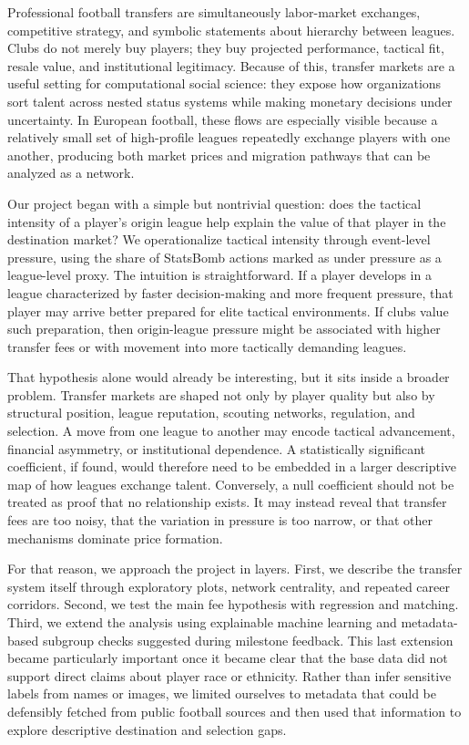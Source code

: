 \documentclass[12pt]{article}
\begin{document}
Professional football transfers are simultaneously labor-market exchanges, competitive strategy, and symbolic statements about hierarchy between leagues. Clubs do not merely buy players; they buy projected performance, tactical fit, resale value, and institutional legitimacy. Because of this, transfer markets are a useful setting for computational social science: they expose how organizations sort talent across nested status systems while making monetary decisions under uncertainty. In European football, these flows are especially visible because a relatively small set of high-profile leagues repeatedly exchange players with one another, producing both market prices and migration pathways that can be analyzed as a network.

Our project began with a simple but nontrivial question: does the tactical intensity of a player's origin league help explain the value of that player in the destination market? We operationalize tactical intensity through event-level pressure, using the share of StatsBomb actions marked as under pressure as a league-level proxy. The intuition is straightforward. If a player develops in a league characterized by faster decision-making and more frequent pressure, that player may arrive better prepared for elite tactical environments. If clubs value such preparation, then origin-league pressure might be associated with higher transfer fees or with movement into more tactically demanding leagues.

That hypothesis alone would already be interesting, but it sits inside a broader problem. Transfer markets are shaped not only by player quality but also by structural position, league reputation, scouting networks, regulation, and selection. A move from one league to another may encode tactical advancement, financial asymmetry, or institutional dependence. A statistically significant coefficient, if found, would therefore need to be embedded in a larger descriptive map of how leagues exchange talent. Conversely, a null coefficient should not be treated as proof that no relationship exists. It may instead reveal that transfer fees are too noisy, that the variation in pressure is too narrow, or that other mechanisms dominate price formation.

For that reason, we approach the project in layers. First, we describe the transfer system itself through exploratory plots, network centrality, and repeated career corridors. Second, we test the main fee hypothesis with regression and matching. Third, we extend the analysis using explainable machine learning and metadata-based subgroup checks suggested during milestone feedback. This last extension became particularly important once it became clear that the base data did not support direct claims about player race or ethnicity. Rather than infer sensitive labels from names or images, we limited ourselves to metadata that could be defensibly fetched from public football sources and then used that information to explore descriptive destination and selection gaps.
\end{document}
